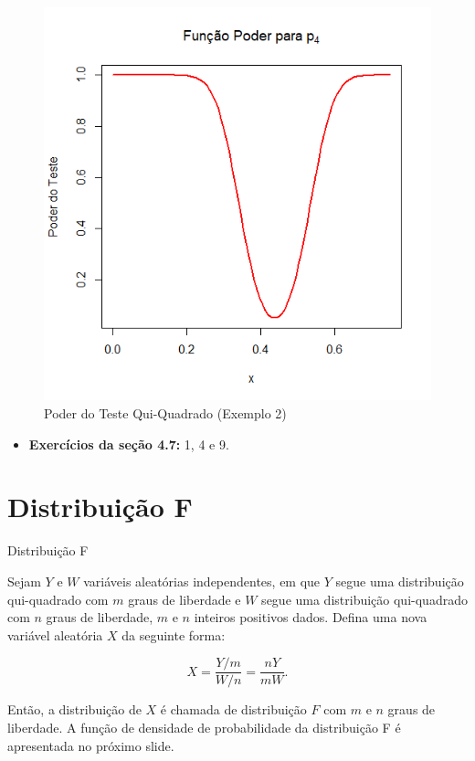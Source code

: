 \documentclass[12pt]{beamer}
\begin{document}
\begin{frame}{}
\begin{block}{}
\begin{figure}
    \centering
    \includegraphics[scale=0.5]{figs/Ex2p4.png}
    \caption{Poder do Teste Qui-Quadrado (Exemplo 2)}
    \label{fig:enter-label}
\end{figure}
\end{block}
\end{frame}


\begin{frame}{\Home}
\begin{block}{}
\justifying

\begin{itemize}
    \item \textbf{Exercícios da seção 4.7:} 1, 4 e 9.
\end{itemize}
\nocite{hogg}
\end{block}
\end{frame}

\section{Distribuição F}
\begin{frame}{Distribuição F}
\begin{definicao}
\justifying
Sejam $Y$ e $W$ variáveis aleatórias independentes, em que $Y$ segue uma distribuição qui-quadrado com $m$ graus de liberdade e $W$ segue uma distribuição qui-quadrado com $n$ graus de liberdade, $m$ e $n$ inteiros positivos dados. Defina uma nova variável aleatória $X$ da seguinte forma:

\[
X = \dfrac{Y/m}{W/n} = \frac{nY}{mW}.
\]

Então, a distribuição de $X$ é chamada de distribuição $F$ com $m$ e $n$ graus de liberdade. A função de densidade de probabilidade da distribuição F é apresentada no próximo slide.
\end{definicao}
\end{frame}
\end{document}
